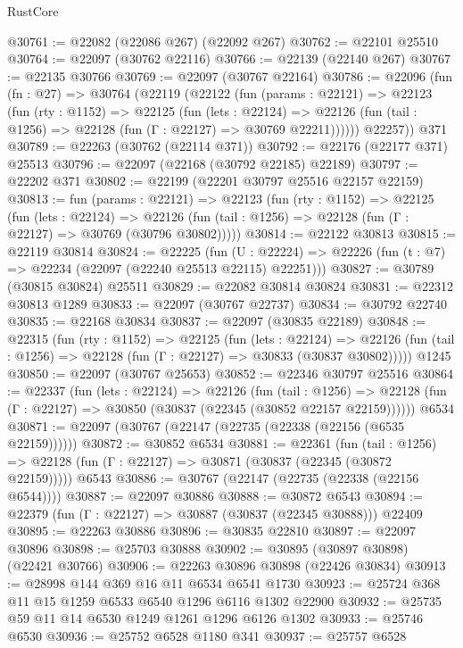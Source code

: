 \begin{lexlean}{RustCore}
\begin{coremodule}
@30761 := @22082 (@22086 @267) (@22092 @267)
@30762 := @22101 @25510
@30764 := @22097 (@30762 @22116)
@30766 := @22139 (@22140 @267)
@30767 := @22135 @30766
@30769 := @22097 (@30767 @22164)
@30786 := @22096
    (fun (fn : @27) =>
    @30764
      (@22119
        (@22122
          (fun (params : @22121) =>
          @22123
            (fun (rty : @1152) =>
            @22125
              (fun (lets : @22124) =>
              @22126 (fun (tail : @1256) => @22128 (fun (Γ : @22127) => @30769 @22211))))))
        @22257))
    @371
@30789 := @22263 (@30762 (@22114 @371))
@30792 := @22176 (@22177 @371) @25513
@30796 := @22097 (@22168 (@30792 @22185) @22189)
@30797 := @22202 @371
@30802 := @22199 (@22201 @30797 @25516 @22157 @22159)
@30813 := fun (params : @22121) =>
  @22123
    (fun (rty : @1152) =>
    @22125
      (fun (lets : @22124) =>
      @22126 (fun (tail : @1256) => @22128 (fun (Γ : @22127) => @30769 (@30796 @30802)))))
@30814 := @22122 @30813
@30815 := @22119 @30814
@30824 := @22225
    (fun (U : @22224) => @22226 (fun (t : @7) => @22234 (@22097 (@22240 @25513 @22115) @22251)))
@30827 := @30789 (@30815 @30824) @25511
@30829 := @22082 @30814 @30824
@30831 := @22312 @30813 @1289
@30833 := @22097 (@30767 @22737)
@30834 := @30792 @22740
@30835 := @22168 @30834
@30837 := @22097 (@30835 @22189)
@30848 := @22315
    (fun (rty : @1152) =>
    @22125
      (fun (lets : @22124) =>
      @22126 (fun (tail : @1256) => @22128 (fun (Γ : @22127) => @30833 (@30837 @30802)))))
    @1245
@30850 := @22097 (@30767 @25653)
@30852 := @22346 @30797 @25516
@30864 := @22337
    (fun (lets : @22124) =>
    @22126
      (fun (tail : @1256) =>
      @22128 (fun (Γ : @22127) => @30850 (@30837 (@22345 (@30852 @22157 @22159))))))
    @6534
@30871 := @22097 (@30767 (@22147 (@22735 (@22338 (@22156 (@6535 @22159))))))
@30872 := @30852 @6534
@30881 := @22361
    (fun (tail : @1256) => @22128 (fun (Γ : @22127) => @30871 (@30837 (@22345 (@30872 @22159)))))
    @6543
@30886 := @30767 (@22147 (@22735 (@22338 (@22156 @6544))))
@30887 := @22097 @30886
@30888 := @30872 @6543
@30894 := @22379 (fun (Γ : @22127) => @30887 (@30837 (@22345 @30888))) @22409
@30895 := @22263 @30886
@30896 := @30835 @22810
@30897 := @22097 @30896
@30898 := @25703 @30888
@30902 := @30895 (@30897 @30898) (@22421 @30766)
@30906 := @22263 @30896 @30898 (@22426 @30834)
@30913 := @28998 @144 @369 @16 @11 @6534 @6541 @1730
@30923 := @25724 @368 @11 @15 @1259 @6533 @6540 @1296 @6116 @1302 @22900
@30932 := @25735 @59 @11 @14 @6530 @1249 @1261 @1296 @6126 @1302
@30933 := @25746 @6530
@30936 := @25752 @6528 @1180 @341
@30937 := @25757 @6528

\end{coremodule}
\end{lexlean}
